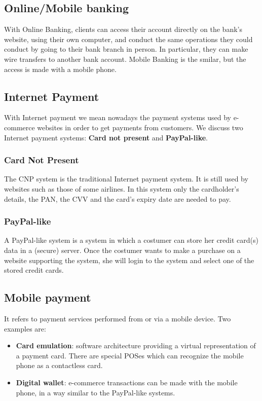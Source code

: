 \documentclass[a4paper, 10pt, titlepage]{article}
\begin{document}
\subsection{Online/Mobile banking}
With Online Banking, clients can access their account directly on the bank's website, using their own computer, and conduct the same operations they could conduct by going to their bank branch in person. In particular, they can make wire transfers to another bank account. Mobile Banking is the smilar, but the access is made with a mobile phone.

\subsection{Internet Payment}
With Internet payment we mean nowadays the payment systems used by e-commerce websites in order to get payments from customers. We discuss two Internet payment systems: \textbf{Card not present} and \textbf{PayPal-like}.

\subsubsection{Card Not Present}
The CNP system is the traditional Internet payment system. It is still used by websites such as those of some airlines. In this system only the cardholder's details, the PAN, the CVV and the card's expiry date are needed to pay.

\subsubsection{PayPal-like}
A PayPal-like system is a system in which a costumer can store her credit card(s) data in a (secure) server. Once the costumer wants to make a purchase on a website supporting the system, she will login to the system and select one of the stored credit cards. 

\subsection{Mobile payment}
It refers to payment services performed from or via a mobile device. Two examples are:
\begin{itemize}
\item \textbf{Card emulation}: software architecture providing a virtual representation of a payment card. There are special POSes which can recognize the mobile phone as a contactless card.
\item \textbf{Digital wallet}: e-commerce transactions can be made with the mobile phone, in a way similar to the PayPal-like systems.
\end{itemize}
\end{document}
